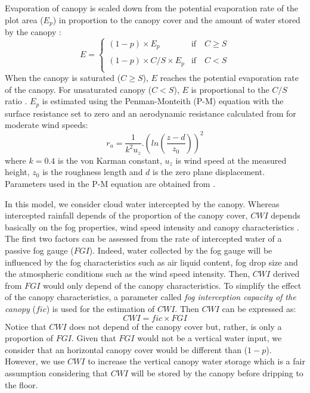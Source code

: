 \documentclass[a4paper,12pt]{article}
\begin{document}
\begin{linenumbers}
Evaporation of canopy is scaled down from the potential evaporation rate of the plot area ($E_p$) in proportion to the canopy cover and the amount of water stored by the canopy \citep{Pryetetal2012a}:
\begin{equation} \label{eq:fog_evaporation}
E=%
  \begin{cases}
    (1-p) \times E_p & \mathrm{if} \quad C \geq S \\
    \\
    (1-p) \times C/S \times E_p & \mathrm{if} \quad C < S \\
  \end{cases}
\end{equation}
When the canopy is saturated ($C \geq S$), $E$ reaches the potential evaporation rate of the canopy. For unsaturated canopy ($C < S$), $E$ is proportional to the $C/S$ ratio \citep{Rutter1975, WhiteheadandKelliher1991, Valenteetal1997}. $E_p$ is estimated using the Penman-Monteith (P-M) equation \citep{Monteith1965} with the surface resistance set to zero \citep{Rutter1975, Kelliheretal1993, Muzyloetal2009} and an aerodynamic resistance  calculated from \cite{Rutter1971,Rutter1975} for moderate wind speeds:
\begin{equation} \label{eq:ra}
    r_a = \dfrac{1}{k^2u_z}.\left(ln \left(\dfrac{z-d}{z_0} \right) \right)^2  
\end{equation}
where $k=0.4$ is the von Karman constant, $u_z$ is wind speed at the measured height, $z_0$ is the roughness length and $d$ is the zero plane displacement. Parameters used in the P-M equation are obtained from \cite{Pryetetal2012a}.  


In this model, we consider cloud water intercepted by the canopy. Whereas intercepted rainfall depends of the proportion of the canopy cover, $CWI$ depends basically on the fog properties, wind speed intensity and canopy characteristics \citep{Bruijnzeeletal2006, Villegasetal2008, Holwerdaetal2010, Pryetetal2012a}. The first two factors can be assessed from the rate of intercepted water of a passive fog gauge ($FGI$). Indeed, water collected by the fog gauge will be influenced by the fog characteristics such as air liquid content, fog drop size and the atmospheric conditions such as the wind speed intensity. Then, $CWI$ derived from $FGI$ would only depend of the canopy characteristics. To simplify the effect of the canopy characteristics, a parameter called \textit{fog interception capacity of the canopy} ($fic$) is used for the estimation of $CWI$. Then $CWI$ can be expressed as:
\begin{equation} \label{eq:fog_wi}
    CWI = fic \times FGI
\end{equation}
Notice that $CWI$ does not depend of the canopy cover but, rather, is only a proportion of $FGI$. Given that $FGI$ would not be a vertical water input, we consider that an horizontal canopy cover would be different than ($1-p$). However, we use $CWI$ to increase the vertical canopy water storage which is a fair assumption considering that $CWI$ will be stored by the canopy before dripping to the floor. 


\end{linenumbers}
\end{document}
